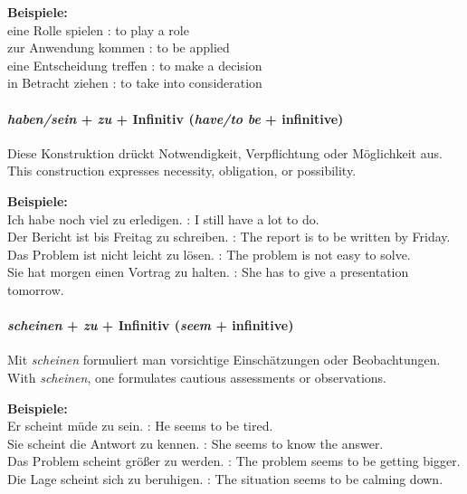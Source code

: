 \documentclass[a4paper]{article}
\begin{document}
        \textbf{Beispiele:}\\
        eine Rolle spielen : to play a role\\
        zur Anwendung kommen : to be applied\\
        eine Entscheidung treffen : to make a decision\\
        in Betracht ziehen : to take into consideration
    
    \paragraph{\textit{haben/sein} + \textit{zu} + Infinitiv {\small (\textit{have/to be} + infinitive)}}
        Diese Konstruktion drückt Notwendigkeit, Verpflichtung oder Möglichkeit aus.\\
        This construction expresses necessity, obligation, or possibility.
        
        \textbf{Beispiele:}\\
        Ich habe noch viel zu erledigen. : I still have a lot to do.\\
        Der Bericht ist bis Freitag zu schreiben. : The report is to be written by Friday.\\
        Das Problem ist nicht leicht zu lösen. : The problem is not easy to solve.\\
        Sie hat morgen einen Vortrag zu halten. : She has to give a presentation tomorrow.
    
    \paragraph{\textit{scheinen} + \textit{zu} + Infinitiv {\small (\textit{seem} + infinitive)}}
        Mit \textit{scheinen} formuliert man vorsichtige Einschätzungen oder Beobachtungen.\\
        With \textit{scheinen}, one formulates cautious assessments or observations.
        
        \textbf{Beispiele:}\\
        Er scheint müde zu sein. : He seems to be tired.\\
        Sie scheint die Antwort zu kennen. : She seems to know the answer.\\
        Das Problem scheint größer zu werden. : The problem seems to be getting bigger.\\
        Die Lage scheint sich zu beruhigen. : The situation seems to be calming down.
    
\end{document}
